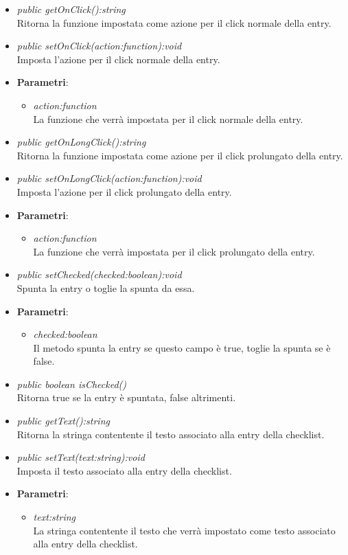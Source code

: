 \begin{itemize}
\begin{itemize}
{\begin{itemize}
		\end{itemize}}
	\item \textit{public getOnClick():string}\\
	Ritorna la funzione impostata come azione per il click normale della entry.
	\item \textit{public setOnClick(action:function):void}\\
	Imposta l'azione per il click normale della entry.
		\item{\textbf{Parametri}: \begin{itemize}
		\item \textit{action:function}\\
		La funzione che verrà impostata per il click normale della entry.
		\end{itemize}}
	\item \textit{public getOnLongClick():string}\\
	Ritorna la funzione impostata come azione per il click prolungato della entry.	
	\item \textit{public setOnLongClick(action:function):void}\\
	Imposta l'azione per il click prolungato della entry.	
		\item{\textbf{Parametri}: \begin{itemize}
		\item \textit{action:function}\\
		La funzione che verrà impostata per il click prolungato della entry.
		\end{itemize}}
	\item \textit{public setChecked(checked:boolean):void}\\
	Spunta la entry o toglie la spunta da essa.
		\item{\textbf{Parametri}: \begin{itemize}
		\item \textit{checked:boolean}\\
		Il metodo spunta la entry se questo campo è true, toglie la spunta se è false.
		\end{itemize}}
	\item \textit{public boolean isChecked()}\\
	Ritorna true se la entry è spuntata, false altrimenti.
	\item \textit{public getText():string}\\
	Ritorna la stringa contentente il testo associato alla entry della checklist.
	\item \textit{public setText(text:string):void}\\
	Imposta il testo associato alla entry della checklist.
		\item{\textbf{Parametri}: \begin{itemize}
		\item \textit{text:string}\\
		La stringa contentente il testo che verrà impostato come testo associato alla entry della checklist.
		\end{itemize}}
	\end{itemize}
\end{itemize}

